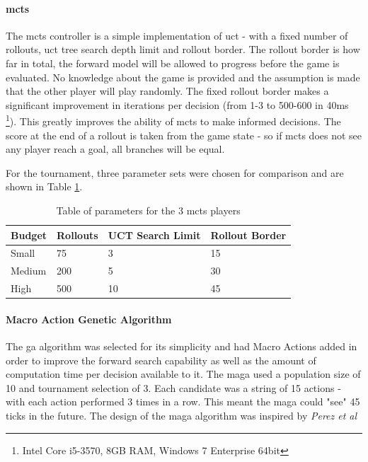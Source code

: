 \documentclass{IEEEtran}
\begin{document}
\paragraph{\gls{mcts}}
The \gls{mcts} controller is a simple implementation of \gls{uct} - with a fixed number of rollouts, \gls{uct} tree search depth limit and rollout border. The rollout border is how far in total, the forward model will be allowed to progress before the game is evaluated. No knowledge about the game is provided and the assumption is made that the other player will play randomly. The fixed rollout border makes a significant improvement in iterations per decision (from 1-3 to 500-600 in 40ms \footnote{Intel Core i5-3570, 8GB RAM, Windows 7 Enterprise 64bit}). This greatly improves the ability of \gls{mcts} to make informed decisions. The score at the end of a rollout is taken from the game state - so if \gls{mcts} does not see any player reach a goal, all branches will be equal.

For the tournament, three parameter sets were chosen for comparison and are shown in Table \ref{mctsTable}.
\begin{table}[!t]
\begin{center}
\begin{tabular}{|p{2.0cm}|p{2.0cm}|m{1.4cm}|m{1.4cm}|}
\hline
\textbf{Budget} & \textbf{Rollouts} & \textbf{UCT Search Limit} & \textbf{Rollout Border} \\
\hline
Small & 75 & 3 & 15 \\
Medium & 200 & 5 & 30 \\
High & 500 & 10 & 45 \\
\hline
\end{tabular}
\caption{Table of parameters for the 3 \gls{mcts} players}
\label{mctsTable}
\end{center}
\end{table}

\paragraph{Macro Action Genetic Algorithm}
The \gls{ga} algorithm was selected for its simplicity and had Macro Actions added in order to improve the forward search capability as well as the amount of computation time per decision available to it. The \gls{maga} used a population size of 10 and tournament selection of 3. Each candidate was a string of 15 actions - with each action performed 3 times in a row. This meant the \gls{maga} could "see" 45 ticks in the future. The design of the \gls{maga} algorithm was inspired by \textit{Perez et al} \cite{perez2013rolling}
\end{document}
